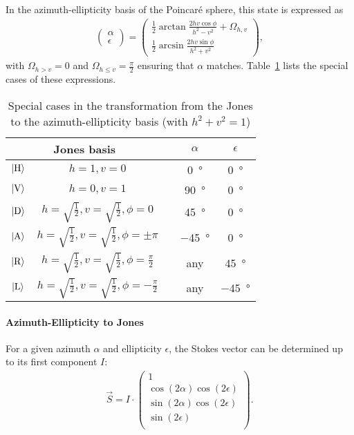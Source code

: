 In the azimuth-ellipticity basis of the Poincaré sphere, this state is expressed as
\begin{align}
    \begin{pmatrix}\alpha \\ \epsilon \end{pmatrix} =
    \begin{pmatrix}
        \frac{1}{2} \arctan \frac{2hv \cos \phi}{h^2 - v^2} + \Omega_{h, v}\\
        \frac{1}{2} \arcsin \frac{2hv\sin\phi}{h^2 + v^2}
    \end{pmatrix}
    ,
\end{align}
with $\Omega_{h > v} = 0$ and $\Omega_{h \leq v} = \frac{\pi}{2}$ ensuring that $\alpha$ matches. Table~\ref{tab:jones_to_ae_special_cases} lists the special cases of these expressions.
\begin{table}
    \centering
    \begin{tabular}{ccccc}
        \toprule
        \multicolumn{2}{c}{Jones basis} && $\alpha$ & $\epsilon$ \\
        \toprule
        $\Ket{\text{H}}$ & $h = 1, v = 0$ && \SI[]{0}{\degree} & \SI[]{0}{\degree} \\
        $\Ket{\text{V}}$ & $h = 0, v = 1$ && \SI[]{+90}{\degree} & \SI[]{0}{\degree} \\
        $\Ket{\text{D}}$ & $h = \sqrt{\frac{1}{2}}, v = \sqrt{\frac{1}{2}}, \phi = 0$ && \SI[]{+45}{\degree} & \SI[]{0}{\degree} \\
        $\Ket{\text{A}}$ & $h = \sqrt{\frac{1}{2}}, v = \sqrt{\frac{1}{2}}, \phi = \pm\pi$ && \SI[]{-45}{\degree} & \SI[]{0}{\degree} \\
        $\Ket{\text{R}}$ & $h = \sqrt{\frac{1}{2}}, v = \sqrt{\frac{1}{2}}, \phi = \frac{\pi}{2}$ && any & \SI[]{+45}{\degree} \\
        $\Ket{\text{L}}$ & $h = \sqrt{\frac{1}{2}}, v = \sqrt{\frac{1}{2}}, \phi = -\frac{\pi}{2}$ && any & \SI[]{-45}{\degree} \\
        \bottomrule
    \end{tabular}
    \caption{Special cases in the transformation from the Jones to the azimuth-ellipticity basis (with $h^2 + v^2 = 1$)}   
    \label{tab:jones_to_ae_special_cases}
\end{table}

\paragraph*{Azimuth-Ellipticity to Jones}
For a given azimuth $\alpha$ and ellipticity $\epsilon$, the Stokes vector can be determined up to its first component $I$:
\begin{align}
    \vec S = I \cdot 
    \begin{pmatrix}
        1 \\
        \cos (2\alpha) \cos(2\epsilon) \\
        \sin (2\alpha) \cos(2\epsilon) \\
        \sin(2\epsilon) \\
    \end{pmatrix}.
\end{align}

